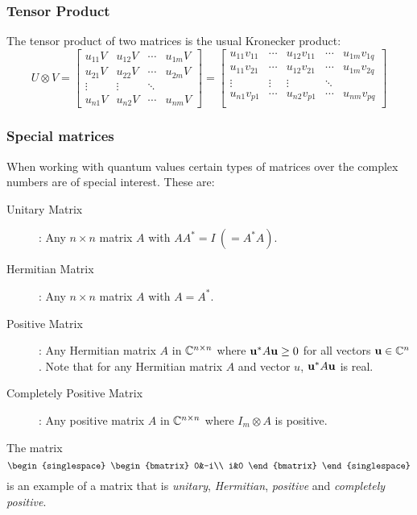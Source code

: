 \subsubsection{Tensor Product} %
\label{ssub:tensor_product}


The tensor product of two matrices is the usual Kronecker product:
  \[
    U\otimes V =
    \begin{bmatrix}
      u_{11}V&u_{12}V & \cdots &u_{1m}V\\
      u_{21}V&u_{22}V & \cdots &u_{2m}V \\
      \vdots&\vdots&\ddots\\
      u_{n1}V&u_{n2}V & \cdots &u_{nm}V
    \end{bmatrix}
    =
    \begin{bmatrix}
      u_{11}v_{11}&\cdots&u_{12}v_{11} & \cdots& u_{1m}v_{1q} \\
      u_{11}v_{21}&\cdots&u_{12}v_{21} & \cdots& u_{1m}v_{2q} \\
      \vdots&\vdots&\vdots&\ddots \\
      u_{n1}v_{p1}&\cdots&u_{n2}v_{p1} & \cdots& u_{nm}v_{pq} \\
    \end{bmatrix}
  \]

\subsubsection{Special matrices} %
\label{ssub:special_matrices}

When working with quantum values certain types of matrices over the complex numbers are of special
interest. These are:
\begin{description}
  \item[Unitary Matrix]: Any $n \times n$  matrix $A$ with $A A^{*} = I\ (= A^{*} A)$.
  \item[Hermitian Matrix]: Any  $n \times n$ matrix $A$ with $A=A^{*}$.
  \item[Positive Matrix]: Any Hermitian matrix $A$ in  $\mathbb{C}^{n\times n}$
    where $\mathbf{u}^{*} A \mathbf{u} \ge 0$ for all vectors  $\mathbf{u}\in \mathbb{C}^n$. Note
    that for any Hermitian matrix $A$ and vector $u$,  $\mathbf{u}^{*} A \mathbf{u}$ is real.
  \item[Completely Positive Matrix]: Any positive matrix $A$ in  $\mathbb{C}^{n\times n}$
    where $I_m \otimes A$ is positive.
\end{description}
The matrix
  \[
    {\begin{singlespace}
      \begin{bmatrix}
        0&-i\\
        i&0
      \end{bmatrix}
    \end{singlespace}}
  \]
is an example of a matrix that is \emph{unitary}, \emph{Hermitian}, \emph{positive} and
\emph{completely positive}.


